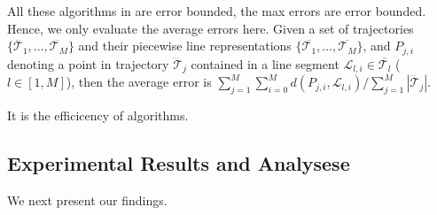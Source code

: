 All these algorithms in  are error bounded, \ie the max errors are error bounded. Hence, we only evaluate the average errors here. Given a set of trajectories $\{\dddot{\mathcal{T}_1}, \ldots, \dddot{\mathcal{T}_M}\}$ and their piecewise line representations
$\{\overline{\mathcal{T}_1}, \ldots, \overline{\mathcal{T}_M}\}$, and $P_{j,i}$ denoting
a point in trajectory $\dddot{\mathcal{T}}_j$ contained in a line segment $\mathcal{L}_{l,i}\in\overline{\mathcal{T}_l}$ ($l\in[1,M]$),
then the average error is $\sum_{j=1}^{M}\sum_{i=0}^{M} d(P_{j,i},
\mathcal{L}_{l,i})/\sum_{j=1}^{M}{|\dddot{\mathcal{T}}_j |}$.

It is the efficicency of algorithms.

\subsection{Experimental Results and Analysese}
We next present our findings.



